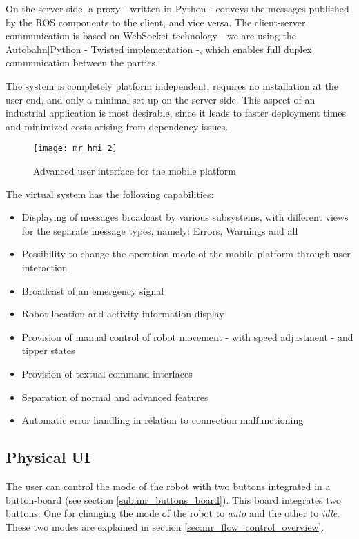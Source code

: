 	On the server side, a proxy - written in Python\cite{python} - conveys the messages published by the ROS\cite{ros} components to the client, and vice versa. The client-server communication is based on WebSocket\cite{ws} technology - we are using the Autobahn|Python\cite{autobahn} - Twisted\cite{twisted} implementation -, which enables full duplex communication between the parties.
	
	The system is completely platform independent, requires no installation at the user end, and only a minimal set-up on the server side. This aspect of an industrial application is most desirable, since it leads to faster deployment times and minimized costs arising from dependency issues.
	
	\begin{figure}[H]
		\centering
		\texttt{[image: mr\_hmi\_2]}
		\caption{Advanced user interface for the mobile platform}
		\label{fig:mr_hmi_2}
	\end{figure}
	
	The virtual system has the following capabilities:
	
	\begin{itemize}
		\item Displaying of messages broadcast by various subsystems, with different views for the separate message types, namely: Errors, Warnings and all
		\item Possibility to change the operation mode of the mobile platform through user interaction
		\item Broadcast of an emergency signal
		\item Robot location and activity information display
		\item Provision of manual control of robot movement - with speed adjustment - and tipper states
		\item Provision of textual command interfaces
		\item Separation of normal and advanced features
		\item Automatic error handling in relation to connection malfunctioning 
	\end{itemize}


	\subsection{Physical UI} %
	\label{sub:mr_physical_devices}
	The user can control the mode of the robot with two buttons integrated in a button-board (see section \ref{sub:mr_buttons_board}).
	This board integrates two buttons: One for changing the mode of the robot to \emph{auto} and the other to \emph{idle}. These two modes are explained in section \ref{sec:mr_flow_control_overview}.

